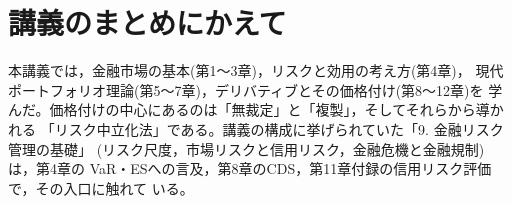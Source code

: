 \section*{講義のまとめにかえて}

本講義では，金融市場の基本(第1〜3章)，リスクと効用の考え方(第4章)，
現代ポートフォリオ理論(第5〜7章)，デリバティブとその価格付け(第8〜12章)を
学んだ。価格付けの中心にあるのは「無裁定」と「複製」，そしてそれらから導かれる
「リスク中立化法」である。講義の構成に挙げられていた「9. 金融リスク管理の基礎」
(リスク尺度，市場リスクと信用リスク，金融危機と金融規制)は，第4章の
VaR・ESへの言及，第8章のCDS，第11章付録の信用リスク評価で，その入口に触れて
いる。
